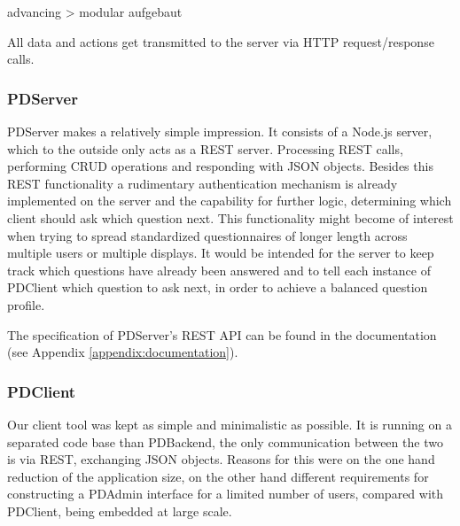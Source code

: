 


			advancing > modular aufgebaut


		All data and actions get transmitted to the server via HTTP request/response calls.

	\subsubsection{PDServer}

		PDServer makes a relatively simple impression. It consists of a Node.js server, which to the outside only acts as a REST server. Processing REST calls, performing CRUD operations and responding with JSON objects. Besides this REST functionality a rudimentary authentication mechanism is already implemented on the server and the capability for further logic, determining which client should ask which question next. This functionality might become of interest when trying to spread standardized questionnaires of longer length across multiple users or multiple displays. It would be intended for the server to keep track which questions have already been answered and to tell each instance of PDClient which question to ask next, in order to achieve a balanced question profile.


		The specification of PDServer's REST API can be found in the documentation (see Appendix \ref{appendix:documentation}).



	\subsubsection{PDClient}

		Our client tool was kept as simple and minimalistic as possible. It is running on a separated code base than PDBackend, the only communication between the two is via REST, exchanging JSON objects. Reasons for this were on the one hand reduction of the application size, on the other hand different requirements for constructing a PDAdmin interface for a limited number of users, compared with PDClient, being embedded at large scale.


